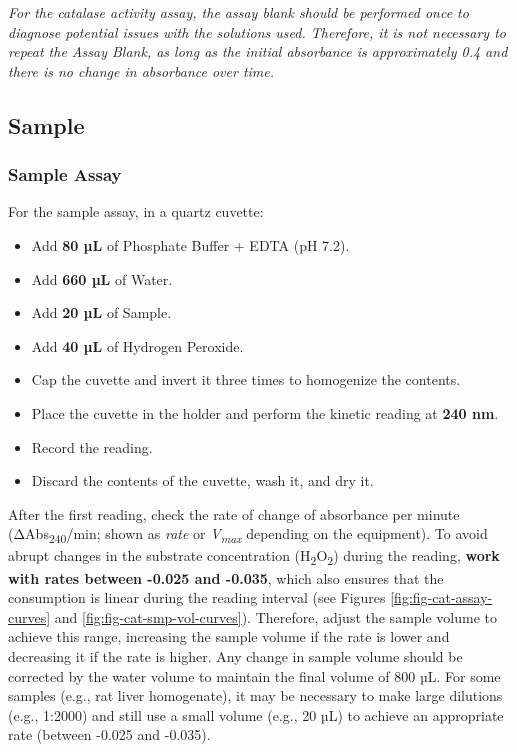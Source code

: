 \documentclass[
  9pt,
  american,
  a5paper,
  extrafontsizes,onecolumn,openright
  ]{memoir}
\providecommand{\tightlist}{%
  \setlength{\itemsep}{0pt}\setlength{\parskip}{0pt}}
\newlength{\rf}
\begin{document}
\begin{greybox}[frametitle = Note]
\emph{For the catalase activity assay, the assay blank should be performed once to diagnose potential issues with the solutions used. Therefore, it is not necessary to repeat the Assay Blank, as long as the initial absorbance is approximately 0.4 and there is no change in absorbance over time.}

\end{greybox}

\subsection{Sample}\label{sample}

\subsubsection{Sample Assay}\label{cat_smp_assay}

For the sample assay, in a quartz cuvette:

\begin{itemize}
\tightlist
\item
  Add \textbf{80 µL} of Phosphate Buffer + EDTA (pH 7.2).
\item
  Add \textbf{660 µL} of Water.
\item
  Add \textbf{20 µL} of Sample.
\item
  Add \textbf{40 µL} of Hydrogen Peroxide.
\item
  Cap the cuvette and invert it three times to homogenize the contents.
\item
  Place the cuvette in the holder and perform the kinetic reading at \textbf{240 nm}.
\item
  Record the reading.
\item
  Discard the contents of the cuvette, wash it, and dry it.
\end{itemize}

After the first reading, check the rate of change of absorbance per minute (ΔAbs\textsubscript{240}/min; shown as \emph{rate} or \emph{V\textsubscript{max}} depending on the equipment). To avoid abrupt changes in the substrate concentration (H\textsubscript{2}O\textsubscript{2}) during the reading, \textbf{work with rates between -0.025 and -0.035}, which also ensures that the consumption is linear during the reading interval (see Figures \ref{fig:fig-cat-assay-curves} and \ref{fig:fig-cat-smp-vol-curves}). Therefore, adjust the sample volume to achieve this range, increasing the sample volume if the rate is lower and decreasing it if the rate is higher. Any change in sample volume should be corrected by the water volume to maintain the final volume of 800 µL. For some samples (e.g., rat liver homogenate), it may be necessary to make large dilutions (e.g., 1:2000) and still use a small volume (e.g., 20 µL) to achieve an appropriate rate (between -0.025 and -0.035).
\end{document}
